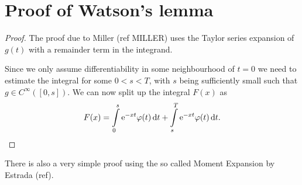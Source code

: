 \section{Proof of Watson's lemma}
\label{sec:proof-watson}
\begin{theorem}
    
    \begin{proof}
        The proof due to Miller (ref MILLER) uses the Taylor series expansion of
        $g(t)$ with a remainder term in the integrand.

        Since we only assume differentiability in some neighbourhood of $t=0$ we
        need to estimate the integral for some $0 < s < T$, with $s$ being
        sufficiently small such that $g\in C^{\infty}([0,s])$. We can now split
        up the integral $F(x)$ as
        \begin{align*}
            F(x) = \Integ[s]{0}{t}{\Eto{-xt}\phi(t)} +
                   \Integ[T]{s}{t}{\Eto{-xt}\phi(t)}.
        \end{align*}
    \end{proof}
    \begin{remark}
        There is also a very simple proof using the so called Moment Expansion
        by Estrada (ref).
    \end{remark}
\end{theorem}
